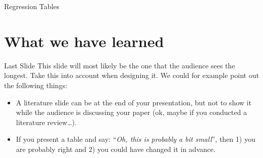 \documentclass[11pt, aspectratio=169, t]{beamer}
\def\tightlist{}
\providecommand{\tightlist}{%
	\setlength{\itemsep}{0pt}\setlength{\parskip}{0pt}}
\begin{document}
\begin{frame}{Regression Tables}
\label{regression-tables}
\begin{table}

\caption{\label{tbl-regression}Linear Regression Models}


\end{table}%
\end{frame}

\section{What we have learned}\label{what-we-have-learned}

\begin{frame}{Last Slide}
\label{last-slide}
This slide will most likely be the one that the audience sees the
longest. Take this into account when designing it. We could for example
point out the following things:

\begin{itemize}
\tightlist
\item
  A literature slide can be at the end of your presentation, but not to
  show it while the audience is discussing your paper (ok, maybe if you
  conducted a literature review\ldots).
\item
  If you present a table and say: ``\emph{Oh, this is probably a bit
  small}'', then 1) you are probably right and 2) you could have changed
  it in advance.
\end{itemize}
\end{frame}
\end{document}
